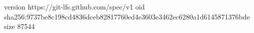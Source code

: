 version https://git-lfs.github.com/spec/v1
oid sha256:9737be8c198cd4836dceb82817760ed4e3603e3462ec6280a1d6145871376bde
size 87544
